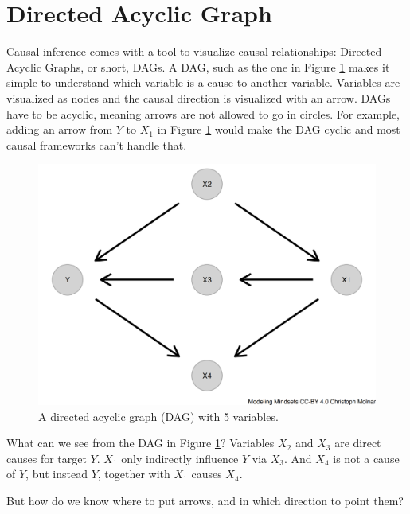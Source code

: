 \documentclass[
  10pt,
]{scrbook}
\begin{document}
\hypertarget{directed-acyclic-graph}{%
\section{Directed Acyclic Graph}\label{directed-acyclic-graph}}

Causal inference comes with a tool to visualize causal relationships: Directed Acyclic Graphs, or short, DAGs.
A DAG, such as the one in Figure \ref{fig:dag} makes it simple to understand which variable is a cause to another variable.
Variables are visualized as nodes and the causal direction is visualized with an arrow.
DAGs have to be acyclic, meaning arrows are not allowed to go in circles.
For example, adding an arrow from \(Y\) to \(X_1\) in Figure \ref{fig:dag} would make the DAG cyclic and most causal frameworks can't handle that.

\begin{figure}

{\centering \includegraphics[width=\textwidth]{figures/dag-1} 

}

\caption{A directed acyclic graph (DAG) with 5 variables.}\label{fig:dag}
\end{figure}

What can we see from the DAG in Figure \ref{fig:dag}?
Variables \(X_2\) and \(X_3\) are direct causes for target \(Y\).
\(X_1\) only indirectly influence \(Y\) via \(X_3\).
And \(X_4\) is not a cause of \(Y\), but instead \(Y\), together with \(X_1\) causes \(X_4\).

But how do we know where to put arrows, and in which direction to point them?
\end{document}
